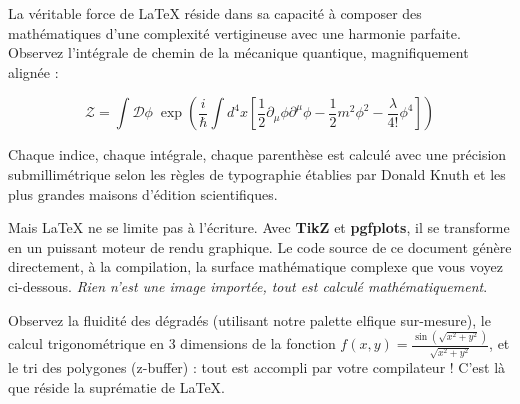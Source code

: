 \documentclass[11pt,a4paper]{article}
\begin{document}
\begin{tcolorbox}[
    enhanced,
    breakable,
    colback=parchment!30!white,
    colframe=elfgreen,
    title=L'Équation Fondamentale,
    fonttitle=\bfseries\Large\scshape,
    attach boxed title to top left={xshift=8mm, yshift=-3mm},
    boxed title style={colback=elfgreen, colframe=elfgold, boxrule=1pt, arc=3mm},
    drop fuzzy shadow=elfgreen!30!black,
    interior style={top color=white, bottom color=parchment!40!white}
]
La véritable force de \LaTeX{} réside dans sa capacité à composer des mathématiques d'une complexité vertigineuse avec une harmonie parfaite. Observez l'intégrale de chemin de la mécanique quantique, magnifiquement alignée :

\begin{equation}
    \mathcal{Z} = \int \mathcal{D}\phi \; \exp\left( \frac{i}{\hbar} \int d^4x \left[ \frac{1}{2}\partial_\mu\phi\partial^\mu\phi - \frac{1}{2}m^2\phi^2 - \frac{\lambda}{4!}\phi^4 \right] \right)
\end{equation}

Chaque indice, chaque intégrale, chaque parenthèse est calculé avec une précision submillimétrique selon les règles de typographie établies par Donald Knuth et les plus grandes maisons d'édition scientifiques.
\end{tcolorbox}

\vspace{1em}

Mais \LaTeX{} ne se limite pas à l'écriture. Avec \textbf{TikZ} et \textbf{pgfplots}, il se transforme en un puissant moteur de rendu graphique. Le code source de ce document génère directement, à la compilation, la surface mathématique complexe que vous voyez ci-dessous. \textit{Rien n'est une image importée, tout est calculé mathématiquement}.

\begin{center}
\end{center}

Observez la fluidité des dégradés (utilisant notre palette elfique sur-mesure), le calcul trigonométrique en 3 dimensions de la fonction $f(x,y) = \frac{\sin(\sqrt{x^2+y^2})}{\sqrt{x^2+y^2}}$, et le tri des polygones (z-buffer) : tout est accompli par votre compilateur ! C'est là que réside la suprématie de \LaTeX.
\end{document}
